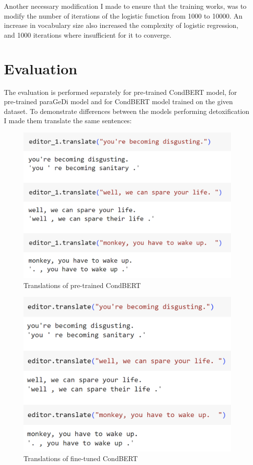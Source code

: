 \documentclass[]{article}
\begin{document}
	Another necessary modification I made to ensure that the training works, was to modify the number of iterations of the logistic function from 1000 to 10000. An increase in vocabulary size also increased the complexity of logistic regression, and 1000 iterations where insufficient for it to converge. 
	
	\section{Evaluation}
	The evaluation is performed separately for pre-trained CondBERT model, for pre-trained paraGeDi model and for CondBERT model trained on the given dataset. To demonstrate differences between the models performing detoxification I made them translate the same sentences:
	
	\begin{figure}[H]
		\includegraphics[scale=1]{../figures/cbtra.png}
		\caption{Translations of pre-trained CondBERT}
	\end{figure} 
	
	\begin{figure}[H]
		\includegraphics[scale=1]{../figures/cb2tra.png}
		\caption{Translations of fine-tuned CondBERT}
	\end{figure} 
	
\end{document}
